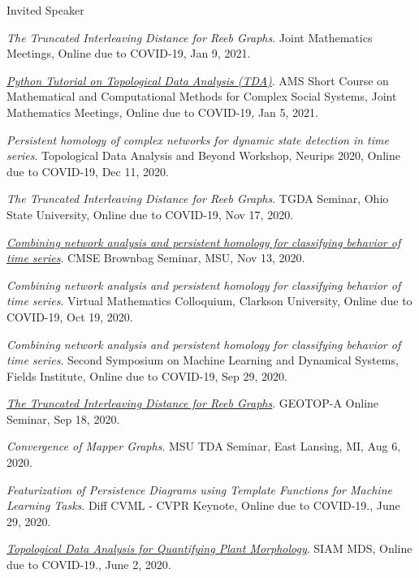 \documentclass{resume} %
\begin{document}
\begin{rSection}{Invited Speaker}
\begin{etaremune}
\item\emph{The Truncated Interleaving Distance for Reeb Graphs}. Joint Mathematics Meetings, Online due to COVID-19, Jan 9, 2021. 

\item\emph{\href{https://github.com/lizliz/TDA-Python-Workshop-JMM21}{Python Tutorial on Topological Data Analysis (TDA)}}. AMS Short Course on Mathematical and Computational Methods for Complex Social Systems, Joint Mathematics Meetings, Online due to COVID-19, Jan 5, 2021. 

\item\emph{Persistent homology of complex networks for dynamic state detection in time series}. Topological Data Analysis and Beyond Workshop, Neurips 2020, Online due to COVID-19, Dec 11, 2020. 

\item\emph{The Truncated Interleaving Distance for Reeb Graphs}. TGDA Seminar, Ohio State University, Online due to COVID-19, Nov 17, 2020. 

\item\emph{\href{https://mediaspace.msu.edu/media/t/1_yghdjfiz}{Combining network analysis and persistent homology for classifying behavior of time series}}. CMSE Brownbag Seminar, MSU, Nov 13, 2020. 

\item\emph{Combining network analysis and persistent homology for classifying behavior of time series}. Virtual Mathematics Colloquium, Clarkson University, Online due to COVID-19, Oct 19, 2020. 

\item\emph{Combining network analysis and persistent homology for classifying behavior of time series}. Second Symposium on Machine Learning and Dynamical Systems, Fields Institute, Online due to COVID-19, Sep 29, 2020. 

\item\emph{\href{https://youtu.be/nyO4KQTmwzU}{The Truncated Interleaving Distance for Reeb Graphs}}. GEOTOP-A Online Seminar, Sep 18, 2020. 

\item\emph{Convergence of Mapper Graphs}. MSU TDA Seminar, East Lansing, MI, Aug 6, 2020. 

\item\emph{Featurization of Persistence Diagrams using Template Functions for Machine Learning Tasks}. Diff CVML - CVPR Keynote, Online due to COVID-19., June 29, 2020. 

\item\emph{\href{https://youtu.be/2mscXkz_o4A}{Topological Data Analysis for Quantifying Plant Morphology}}. SIAM MDS, Online due to COVID-19., June 2, 2020. 


\end{etaremune}
\end{rSection}
\end{document}
